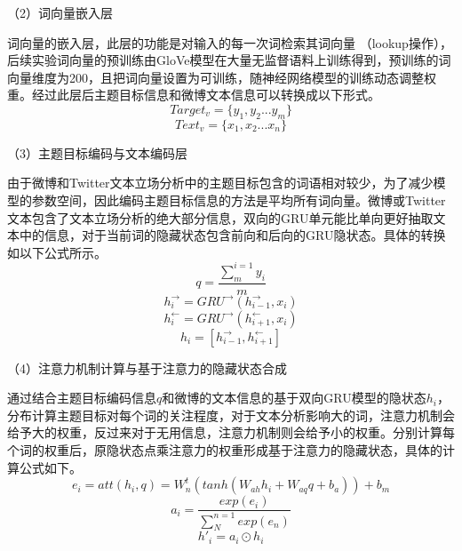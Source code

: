 （2）词向量嵌入层

词向量的嵌入层，此层的功能是对输入的每一次词检索其词向量 （lookup操作），后续实验词向量的预训练由GloVe模型在大量无监督语料上训练得到，预训练的词向量维度为200，且把词向量设置为可训练，随神经网络模型的训练动态调整权重。经过此层后主题目标信息和微博文本信息可以转换成以下形式。
\begin{equation}\label{target_info} Target_v= \lbrace y_1,y_2...y_m\rbrace \end{equation}
\begin{equation}\label{text_info} Text_v=\lbrace x_1,x_2...x_n\rbrace \end{equation}

（3）主题目标编码与文本编码层

由于微博和Twitter文本立场分析中的主题目标包含的词语相对较少，为了减少模型的参数空间，因此编码主题目标信息的方法是平均所有词向量。微博或Twitter文本包含了文本立场分析的绝大部分信息，双向的GRU单元能比单向更好抽取文本中的信息，对于当前词的隐藏状态包含前向和后向的GRU隐状态。具体的转换如以下公式所示。
\begin{equation}\label{target_info} q=\frac{\sum_{m}^{i=1}y_i}{m} \end{equation}
\begin{equation}\label{target_info} h^→_i = GRU^→(h^→_{i-1}, x_i) \end{equation}
\begin{equation}\label{text_info}  h^←_i = GRU^→(h^←_{i+1}, x_i) \end{equation}
\begin{equation}\label{text_info}  h_i = [h^→_{i-1}, h^←_{i+1}] \end{equation}

（4）注意力机制计算与基于注意力的隐藏状态合成

通过结合主题目标编码信息$q$和微博的文本信息的基于双向GRU模型的隐状态$h_i$，分布计算主题目标对每个词的关注程度，对于文本分析影响大的词，注意力机制会给予大的权重，反过来对于无用信息，注意力机制则会给予小的权重。分别计算每个词的权重后，原隐状态点乘注意力的权重形成基于注意力的隐藏状态，具体的计算公式如下。
\begin{equation}\label{conv1} e_i=att(h_i,q)=W^t_n(tanh(W_{ah}h_i+W_{aq}q+b_a))+b_m \end{equation}
\begin{equation}\label{conv1} a_i=\frac{exp(e_i)}{\sum_{N}^{n=1}exp(e_n)} \end{equation}
\begin{equation}\label{conv1} h'_i=a_i \odot h_i \end{equation}

